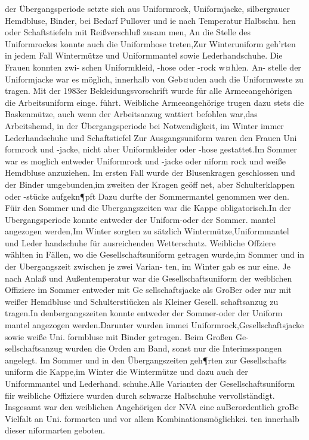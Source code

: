 der Übergangsperiode setzte sich aus Uniformrock,
Uniformjacke, silbergrauer Hemdbluse, Binder, bei
Bedarf Pullover und ie nach Temperatur Halbschu.
hen oder Schaftstiefeln mit Reißverschluß zusam
men, An die Stelle des Uniformrockes konnte auch
die Uniformhose treten,Zur Winteruniform geh'rten in jedem Fall Wintermütze und Uniformmantel
sowie Lederhandschuhe. Die Frauen konnten zwi-
schen Uniformkleid, -hose oder -rock w¤hlen. An-
stelle der Uniformjacke war es möglich, innerhalb
von Geb¤uden auch die Uniformweste zu tragen.
Mit der 1983er Bekleidungsvorschrift wurde für
alle Armeeangehörigen die Arbeitsuniform einge.
führt. Weibliche Armeeangehörige trugen dazu
stets die Baskenmütze, auch wenn der Arbeitsanzug wattiert befohlen war,das Arbeitshemd, in der
Übergangsperiode bei Notwendigkeit, im Winter
immer Lederhandschuhe und Schaftstiefel
Zur Ausgangsuniform waren den Frauen Uni
formrock und -jacke, nicht aber Uniformkleider
oder -hose gestattet.Im Sommer war es moglich
entweder Uniformrock und -jacke oder niform
rock und weiße Hemdbluse anzuziehen. Im ersten
Fall wurde der Blusenkragen geschlossen und der
Binder umgebunden,im zweiten der Kragen geöff
net, aber Schulterklappen oder -stücke aufgekn¶pft
Dazu durfte der Sommermantel genommen wer
den. Füir den Sommer und die Ubergangszeiten war
die Kappe obligatorisch.In der Ubergangsperiode
konnte entweder der Uniform-oder der Sommer.
mantel angezogen werden,Im Winter sorgten zu
sätzlich Wintermütze,Uniformmantel und Leder
handschuhe für ausreichenden Wetterschutz.
Weibliche Offziere wählten in Fällen, wo die
Gesellschaftsuniform getragen wurde,im Sommer
und in der Ubergangszeit zwischen je zwei Varian-
ten, im Winter gab es nur eine. Je nach Anlaß und
Außentemperatur war die Gesellschaftsuniform der
weiblichen Offiziere im Sommer entweder mit Ge
sellschaftsjacke als GroBer oder nur mit weißer
Hemdbluse und Schulterstiücken als Kleiner Gesell.
schaftsanzug zu tragen.In denbergangszeiten
konnte entweder der Sommer-oder der Uniform
mantel angezogen werden.Darunter wurden immei
Uniformrock,Gesellschaftsjacke sowie weiße Uni.
formbluse mit Binder getragen. Beim Großen Ge-
sellschaftsanzug wurden die Orden am Band, sonst
nur die Interimsspangen angelegt. Im Sommer und
in den Übergangszeiten geh¶rten zur Gesellschafts
uniform die Kappe,im Winter die Wintermütze
und dazu auch der Uniformmantel und Lederhand.
schuhe.Alle Varianten der Gesellschaftsuniform
fiir weibliche Offiziere wurden durch schwarze
Halbschuhe vervollständigt.
Insgesamt war den weiblichen Angehörigen der
NVA eine auBerordentlich groBe Vielfalt an Uni.
formarten und vor allem Kombinationsmöglichkei.
ten innerhalb dieser niformarten geboten.